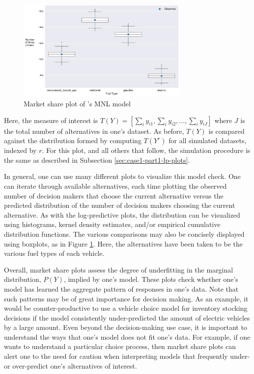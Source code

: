 \documentclass[preprint]{elsarticle}
\begin{document}
\begin{figure}
\centering
\includegraphics[width=0.75\textwidth]{market-share-plot-vehicle-choice-mnl}
\caption{Market share plot of \citeauthor{brownstone_forecasting_1998}'s MNL model}
\label{fig:orig-mnl-market-share}
\end{figure}

Here, the measure of interest is $T \left( Y \right) = \left[ \sum _i y_{i1}, \sum _i y_{i2}, ..., \sum _i y_{iJ} \right]$ where $J$ is the total number of alternatives in one's dataset. As before, $T \left( Y \right)$ is compared against the distribution formed by computing $T \left( Y^r \right)$ for all simulated datasets, indexed by $r$. For this plot, and all others that follow, the simulation procedure is the same as described in Subsection \ref{sec:case1-part1-lp-plots}. 

In general, one can use many different plots to visualize this model check. One can iterate through available alternatives, each time plotting the observed number of decision makers that choose the current alternative versus the predicted distribution of the number of decision makers choosing the current alternative. As with the log-predictive plots, the distribution can be visualized using histograms, kernel density estimates, and/or empirical cumulative distribution functions. The various comparisons may also be concisely displayed using boxplots, as in Figure \ref{fig:orig-mnl-market-share}. Here, the alternatives have been taken to be the various fuel types of each vehicle.

Overall, market share plots assess the degree of underfitting in the marginal distribution, $P \left( Y \right)$, implied by one's model. These plots check whether one's model has learned the aggregate pattern of responses in one's data. Note that such patterns may be of great importance for decision making. As an example, it would be counter-productive to use a vehicle choice model for inventory stocking decisions if the model consistently under-predicted the amount of electric vehicles by a large amount. Even beyond the decision-making use case, it is important to understand the ways that one's model does not fit one's data. For example, if one wants to understand a particular choice process, then market share plots can alert one to the need for caution when interpreting models that frequently under- or over-predict one's alternatives of interest.
\end{document}
